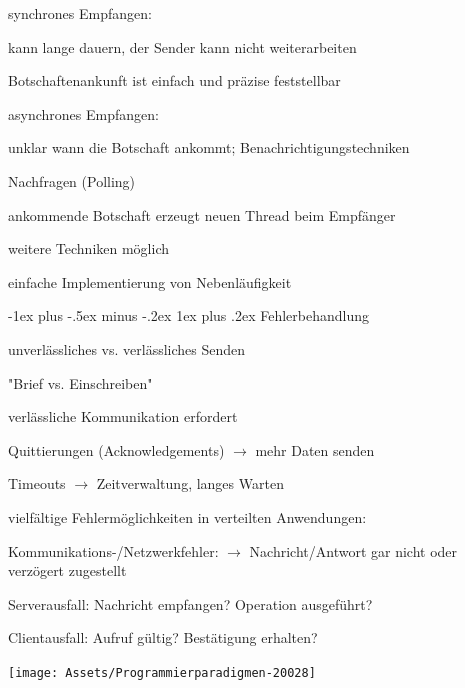 \documentclass[10pt]{article}
\makeatletter
\renewcommand{\subsubsection}{\@startsection{subsubsection}{3}{0mm}%
                                {-1ex plus -.5ex minus -.2ex}%
                                {1ex plus .2ex}%
                                {\normalfont\small\bfseries}}
\makeatother
\begin{document}
  \begin{itemize*}
    \item synchrones Empfangen:
    \begin{itemize*}
      \item kann lange dauern, der Sender kann nicht weiterarbeiten
      \item Botschaftenankunft ist einfach und präzise feststellbar
    \end{itemize*}
    \item asynchrones Empfangen:
    \begin{itemize*}
      \item unklar wann die Botschaft ankommt;
      \newline Benachrichtigungstechniken 
      \begin{itemize*}
        \item Nachfragen (Polling)
        \item ankommende Botschaft erzeugt neuen Thread beim Empfänger
        \item weitere Techniken möglich
      \end{itemize*}
      \item einfache Implementierung von Nebenläufigkeit
    \end{itemize*}
  \end{itemize*}
  
  \subsubsection{Fehlerbehandlung}
  \begin{itemize*}
    \item unverlässliches vs. verlässliches Senden
    \begin{itemize*}
      \item "Brief vs. Einschreiben"
    \end{itemize*}
    \item verlässliche Kommunikation erfordert
    \begin{itemize*}
      \item Quittierungen (Acknowledgements) $\rightarrow$ mehr Daten senden
      \item Timeouts $\rightarrow$ Zeitverwaltung, langes Warten
    \end{itemize*}
    \item vielfältige Fehlermöglichkeiten in verteilten Anwendungen:
    \begin{itemize*}
      \item Kommunikations-/Netzwerkfehler: $\rightarrow$ Nachricht/Antwort gar nicht oder verzögert zugestellt
      \item Serverausfall: Nachricht empfangen? Operation ausgeführt?
      \item Clientausfall: Aufruf gültig? Bestätigung erhalten?
    \end{itemize*}
  \end{itemize*}
  \begin{center}
    \centering
    \texttt{[image: Assets/Programmierparadigmen-20028]}
  \end{center}
  
\end{document}
